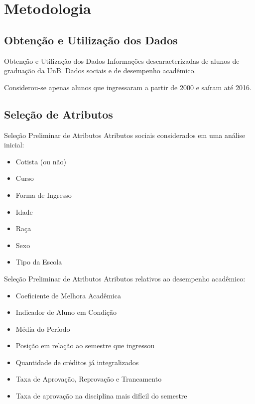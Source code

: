 \section{Metodologia} 
\subsection{Obtenção e Utilização dos Dados}
\begin{frame}{Obtenção e Utilização dos Dados}
    Informações descaracterizadas de alunos de graduação da UnB. Dados sociais e de
    desempenho acadêmico. 

    \vspace{0.5cm}

    Considerou-se apenas alunos que ingressaram a partir de 2000 e saíram até 2016.
\end{frame}

\subsection{Seleção de Atributos}

\begin{frame}{Seleção Preliminar de Atributos}
    Atributos sociais considerados em uma análise inicial: 
    \begin{itemize}
        \item Cotista (ou não)
        \item Curso 
        \item Forma de Ingresso
        \item Idade
        \item Raça 
        \item Sexo 
        \item Tipo da Escola
    \end{itemize}
\end{frame}

\begin{frame}{Seleção Preliminar de Atributos}
    Atributos relativos ao desempenho acadêmico: 
    \begin{itemize}
        \item Coeficiente de Melhora Acadêmica
        \item Indicador de Aluno em Condição
        \item Média do Período
        \item Posição em relação ao semestre que ingressou
        \item Quantidade de créditos já integralizados
        \item Taxa de Aprovação, Reprovação e Trancamento
        \item Taxa de aprovação na disciplina mais difícil do semestre
    \end{itemize}
\end{frame}

